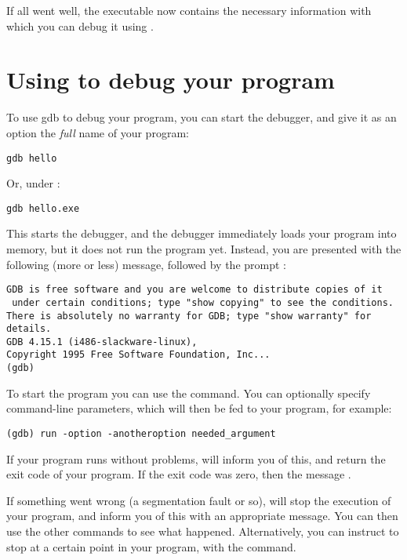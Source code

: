 \documentclass{report}
\begin{document}
If all went well, the executable now contains the necessary information with 
which you can debug it using \gnu {}.


\section{Using  to debug your program}

To use gdb to debug your program, you can start the debugger, and give it as
an option the {\em full} name of your program:
\begin{verbatim}
gdb hello
\end{verbatim}
Or, under \dos :
\begin{verbatim}
gdb hello.exe
\end{verbatim}

This starts the debugger, and the debugger immediately loads your program
into memory, but it does not run the program yet. Instead, you are presented
with the following (more or less) message, followed by the  prompt
:
\begin{verbatim}
GDB is free software and you are welcome to distribute copies of it
 under certain conditions; type "show copying" to see the conditions.
There is absolutely no warranty for GDB; type "show warranty" for details.
GDB 4.15.1 (i486-slackware-linux),
Copyright 1995 Free Software Foundation, Inc...
(gdb)
\end{verbatim}
To start the program you can use the  command. You can optionally 
specify command-line parameters, which will then be fed to your program, for
example:
\begin{verbatim}
(gdb) run -option -anotheroption needed_argument
\end{verbatim}
If your program runs without problems,  will inform you of this,
and return the exit code of your program. If the exit code was zero, then
the message .

If something went wrong (a segmentation fault or so),  will stop
the execution of your program, and inform you of this with an appropriate
message. You can then use the other  commands to see what happened.  
Alternatively, you can instruct  to stop at a certain point in your
program, with the  command.
\end{document}
